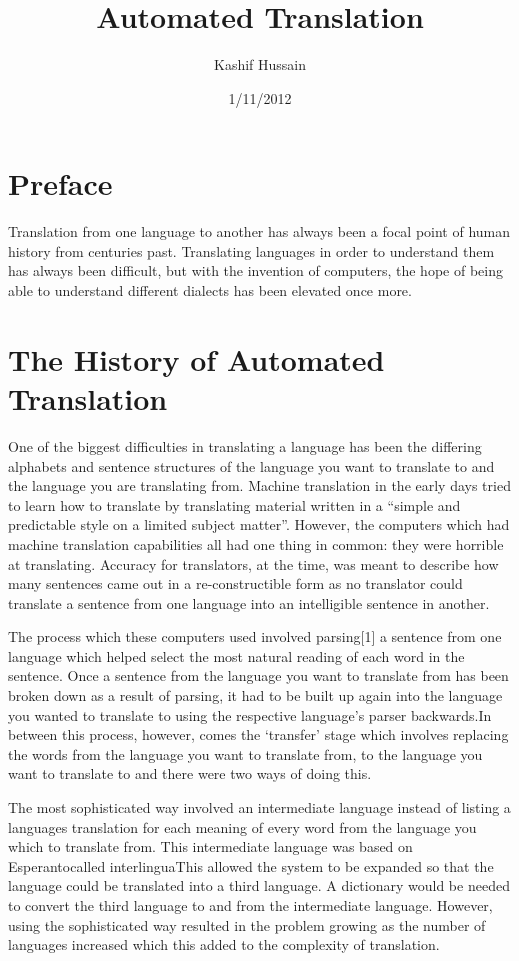 \documentclass[12pt,a4paper]{article}
\title{Automated Translation}
\author{Kashif Hussain}
\date{1/11/2012}
\begin{document}
\maketitle
\tableofcontents

\newpage

\section{Preface}

Translation from one language to another has always been a focal point of human 
history from centuries past. Translating languages in order to understand them has always been difficult, 
but with the invention of computers, the hope of being able to understand different dialects has been elevated once more. 

\section{The History of Automated Translation\cite{Economist Article}}
One of the biggest difficulties in translating a language has been the differing alphabets and sentence structures of the language you want to translate to and the language you are translating from. Machine translation in the early days tried to learn how to translate by translating material written in a “simple and predictable style on a limited subject matter”. 
However, the computers which had machine translation capabilities all had one thing in common: they were horrible at translating.  Accuracy for translators, at the time, was meant to describe how many sentences came out in a re-constructible form as no translator could translate a sentence from one language into an intelligible sentence in another. 

The process which these computers used involved parsing[1] a sentence from one language which helped select the most natural reading of each word in the sentence. Once a sentence from the language you want to translate from has been broken down as a result of parsing, it had to be built up again into the language you wanted to translate to using the respective language’s parser backwards.In between this process, however, comes the ‘transfer’ stage which involves replacing the words from the language you want to translate from, to the language you want to translate to and there were two ways of doing this.

The most sophisticated way involved an intermediate language instead of listing a languages translation for each meaning of every word from the language you which to translate from. This intermediate language was based on Esperanto\footnotemark[1] called interlingua\footnotemark[2]
This allowed the system to be expanded so that the language could be translated into a third language. A dictionary would be needed to convert the third language to and from the intermediate language. However, using the sophisticated way resulted in the problem growing as the number of languages increased which this added to the complexity of translation. 
\end{document}
